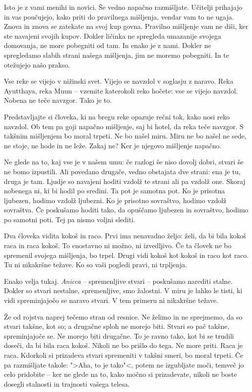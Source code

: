Isto je z vami menihi in novici. Še vedno napačno razmišljate. Učitelji prihajajo in vas poučujejo, kako priti do pravilnega mišljenja, vendar vam to ne ugaja. Znova in znova se zatekate na svoj kup govna. Pravilno mišljenje vam ne diši, ker ste navajeni svojih kupov. Dokler ličinka ne spregleda umazanije svojega domovanja, ne more pobegniti od tam. In enako je z nami. Dokler ne spregledamo slabih strani našega mišljenja, jim ne moremo pobegniti. In te otežujejo našo prakso.

\clearpage


Vse reke se vijejo v nižinski svet. Vijejo se navzdol v soglasju z naravo. Reka Ayutthaya, reka Muun – vzemite katerokoli reko hočete: vse se vijejo navzdol. Nobena ne teče navzgor. Tako je to.

Predstavljajte si človeka, ki na bregu reke opazuje rečni tok, kako nosi reko navzdol. Ob tem pa goji napačno mišljenje, saj bi hotel, da reka teče navzgor. S takšnim mišljenjem bo moral trpeti. Ne bo našel miru. Miru ne bo našel ne sede, ne stoje, ne hode in ne leže. Zakaj ne? Ker je njegovo mišljenje napačno.


Ne glede na to, kaj vse je v našem umu: če razlogi še niso dovolj dobri, stvari še ne bomo izpustili. Ali povedano drugače, vedno obstajata dve strani: ena je tu, druga je tam. Ljudje so navajeni hoditi vzdolž te strani ali pa vzdolž one. Skoraj nobenega ni, ki bi hodil po sredini. Ta pot je samotna pot. Ko je prisotna ljubezen, hodimo vzdolž ljubezni. Ko je prisotno sovraštvo, hodimo vzdolž sovraštva. Če poskušamo hoditi tako, da opuščamo ljubezen in sovraštvo, hodimo po samotni poti. Tej pa nismo voljni slediti.

\clearpage


Dva človeka vidita kokoš in raco. Prvi ima nenavadno željo: želi, da bi bila kokoš raca in raca kokoš. To enostavno ni možno, ni izvedljivo. Če ta človek ne bo spremenil svojega mišljenja, bo trpel. Drugi vidi kokoš kot kokoš in raco kot raco. Tu ni nikakršne težave. Ko so vaši pogledi pravi, ni trpljenja.

Enako velja tukaj. \emph{Anicca} – spremenljive stvari – poskušamo narediti stalne. Dokler so stvari nestalne, spremenljive, smo žalostni. V miru je lahko le tisti, ki vidi spreminjajočo se naravo stvari. V tem primeru ni nikakršne težave.

Že od rojstva naprej tečemo stran od resnice. Ne želimo in ne sprejmemo, da so stvari takšne, kot so; a drugačne sploh ne morejo biti. Stvari so pač takšne, spreminjajoče se. Ne morejo biti drugačne. To je ravno tako, kot bi se trudili doseči, da bi bila raca kokoš. Nikoli ne bo prišlo do tega. Ne more priti. Raca je raca. Kdorkoli si prizadeva stvari spremeniti v takšni smeri, bo moral trpeti. Če pa razmišljate takole: ">Aha, to je tako"<, potem ne izgubljate moči, temveč jo celo pridobite – ker ne glede na to, kako močno si prizadevate, nikoli ne boste dosegli stalnosti in trajnosti vašega telesa.

